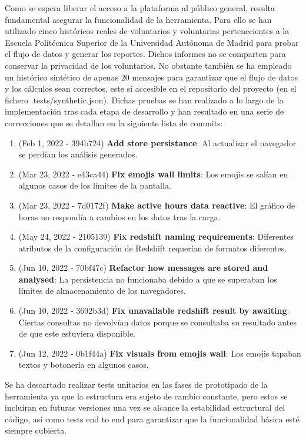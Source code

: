 
Como se espera liberar el acceso a la plataforma al público general, resulta fundamental asegurar la funcionalidad de la herramienta. Para ello se han utilizado cinco históricos reales de voluntarios y voluntarias pertenecientes a la Escuela Politécnica Superior de la Universidad Autónoma de Madrid para probar el flujo de datos y generar los reportes. Dichos informes no se comparten para conservar la privacidad de los voluntarios. No obstante también se ha empleado un histórico sintético de apenas 20 mensajes para garantizar que el flujo de datos y los cálculos sean correctos, este sí accesible en el repositorio del proyecto\cite{Repositorio} (en el fichero .tests/synthetic.json). Dichas pruebas se han realizado a lo largo de la implementación tras cada etapa de desarrollo y han resultado en una serie de correcciones que se detallan en la siguiente lista de commits:

\begin{enumerate}
    \item (Feb 1, 2022 - 394b724) \textbf{Add store persistance}: Al actualizar el navegador se perdían los análisis generados.
    \item (Mar 23, 2022 - e43ca44) \textbf{Fix emojis wall limits}: Los emojis se salían en algunos casos de los límites de la pantalla. 
    \item (Mar 23, 2022 - 7d0172f) \textbf{Make active hours data reactive}: El gráfico de horas no respondía a cambios en los datos tras la carga. 
    \item (May 24, 2022 - 2105139) \textbf{Fix redshift naming requirements}: Diferentes atributos de la configuración de Redshift requerían de formatos diferentes.
    \item (Jun 10, 2022 - 70bf47c) \textbf{Refactor how messages are stored and analysed}: La persistencia no funcionaba debido a que se superaban los límites de almacenamiento de los navegadores.
    \item (Jun 10, 2022 - 3692b3d) \textbf{Fix unavailable redshift result by awaiting}: Ciertas consultas no devolvían datos porque se consultaba su resultado antes de que este estuviera disponible.
    \item (Jun 12, 2022 - 0b1f44a) \textbf{Fix visuals from emojis wall}: Los emojis tapaban textos y botonería en algunos casos.
\end{enumerate}

Se ha descartado realizar tests unitarios en las fases de prototipado de la herramienta ya que la estructura era sujeto de cambio constante, pero estos se incluiran en futuras versiones una vez se alcance la estabilidad estructural del código, así como tests end to end para garantizar que la funcionalidad básica esté siempre cubierta.
